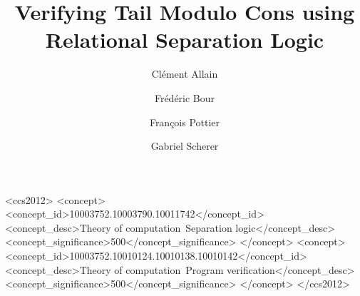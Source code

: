 \documentclass[acmsmall,screen,review,anonymous]{acmart}
\begin{document}

\title{Verifying Tail Modulo Cons using Relational Separation Logic}

\author{Clément Allain}

\author{Frédéric Bour}

\author{François Pottier}

\author{Gabriel Scherer}

\begin{abstract}
    
\end{abstract}

\maketitle


\begin{CCSXML}
<ccs2012>
<concept>
<concept_id>10003752.10003790.10011742</concept_id>
<concept_desc>Theory of computation~Separation logic</concept_desc>
<concept_significance>500</concept_significance>
</concept>
<concept>
<concept_id>10003752.10010124.10010138.10010142</concept_id>
<concept_desc>Theory of computation~Program verification</concept_desc>
<concept_significance>500</concept_significance>
</concept>
</ccs2012>
\end{CCSXML}




\clearpage


\clearpage


\clearpage


\clearpage


\clearpage


\clearpage


\clearpage


\clearpage


\clearpage

%
\end{document}
